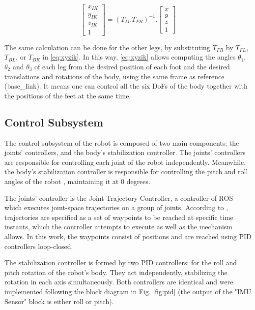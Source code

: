 \documentclass[conference]{IEEEtran}
\begin{document}
\begin{equation}
  \label{eq:xyzik}
  \begin{bmatrix}
    x_{IK} \\
    y_{IK} \\
    z_{IK} \\
    1
  \end{bmatrix}= (T_M.T_{FR})^{-1}.
  \begin{bmatrix}
    x \\
    y \\
    z \\
    1
  \end{bmatrix}
\end{equation}

The same calculation can be done for the other legs, by substituting $T_{FR}$ by $T_{FL}$, $T_{BL}$, or $T_{BR}$ in \eqref{eq:xyzik}. In this way, \eqref{eq:xyzik} allows computing the angles $\theta_1$, $\theta_2$ and $\theta_3$ of each leg from the desired position of each foot and the desired translations and rotations of the body, using the same frame as reference (base\_link). It means one can control all the six DoFs of the body together with the positions of the feet at the same time.

\subsection{Control Subsystem}

The control subsystem of the robot is composed of two main components: the joints' controllers, and the body's stabilization controller. The joints' controllers are responsible for controlling each joint of the robot independently. Meanwhile, the body's stabilization controller is responsible for controlling the pitch and roll angles of the robot \cite{Shi2021, StanfordQuadruped}, maintaining it at 0 degrees.  

The joints' controller is the Joint Trajectory Controller, a controller of ROS which executes joint-space trajectories on a group of joints. According to \cite{JointTrajectory}, trajectories are specified as a set of waypoints to be reached at specific time instants, which the controller attempts to execute as well as the mechanism allows. In this work, the waypoints consist of positions and are reached using PID controllers loop-closed.

The stabilization controller is formed by two PID controllers: for the roll and pitch rotation of the robot's body. They act independently, stabilizing the rotation in each axis simultaneously. Both controllers are identical and were implemented following the block diagram in Fig. \ref{fig:pid} (the output of the "IMU Sensor" block is either roll or pitch).
\end{document}
